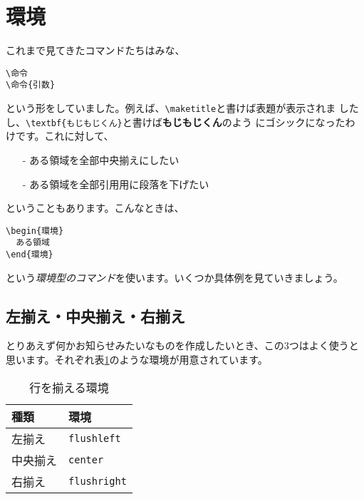 
\section{環境}
これまで見てきたコマンドたちはみな、
\begin{screen}
\begin{verbatim}
\命令
\命令{引数}
\end{verbatim}
\end{screen}
という形をしていました。例えば、\verb+\maketitle+と書けば表題が表示されま
したし、\verb+\textbf{もじもじくん}+と書けば\textbf{もじもじくん}のよう
にゴシックになったわけです。これに対して、
\begin{itemize}
 \item[-] ある領域を全部中央揃えにしたい
 \item[-] ある領域を全部引用用に段落を下げたい
\end{itemize}
ということもあります。こんなときは、
\begin{screen}
\begin{verbatim}
\begin{環境}
  ある領域
\end{環境}
\end{verbatim}
\end{screen}
という\emph{環境型のコマンド}を使います。いくつか具体例を見ていきましょう。

\subsection{左揃え・中央揃え・右揃え}
とりあえず何かお知らせみたいなものを作成したいとき、この3つはよく使うと
思います。それぞれ表\ref{tab:flush}のような環境が用意されています。
\begin{table}[htbp]
\begin{center}
\caption{行を揃える環境}
\label{tab:flush}
\begin{tabular}{ll}
\hline
種類     & 環境             \\
\hline
左揃え   & \verb+flushleft+  \\
中央揃え & \verb+center+     \\
右揃え   & \verb+flushright+ \\
\hline
\end{tabular}
\end{center}
\end{table}

